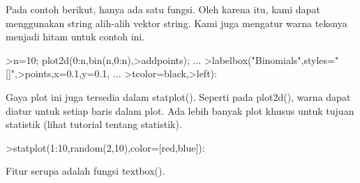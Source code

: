 \documentclass[a4paper,10pt]{article}
\begin{document}
\begin{eulernotebook}
\begin{eulercomment}
\begin{eulercomment}
\begin{eulercomment}
\begin{eulercomment}
\begin{eulercomment}
\begin{eulercomment}
\begin{eulercomment}
Pada contoh berikut, hanya ada satu fungsi. Oleh karena itu, kami
dapat menggunakan string alih-alih vektor string. Kami juga mengatur
warna teksnya menjadi hitam untuk contoh ini.
\end{eulercomment}
\begin{eulerprompt}
>n=10; plot2d(0:n,bin(n,0:n),>addpoints); ...
>labelbox("Binomials",styles="[]",>points,x=0.1,y=0.1, ...
>tcolor=black,>left):
\end{eulerprompt}
\begin{eulercomment}
Gaya plot ini juga tersedia dalam statplot(). Seperti pada plot2d(),
warna dapat diatur untuk setiap baris dalam plot. Ada lebih banyak
plot khusus untuk tujuan statistik (lihat tutorial tentang statistik).
\end{eulercomment}
\begin{eulerprompt}
>statplot(1:10,random(2,10),color=[red,blue]):
\end{eulerprompt}
\begin{eulercomment}
Fitur serupa adalah fungsi textbox().


\end{eulercomment}
\end{eulercomment}
\end{eulercomment}
\end{eulercomment}
\end{eulercomment}
\end{eulercomment}
\end{eulercomment}
\end{eulernotebook}
\end{document}
